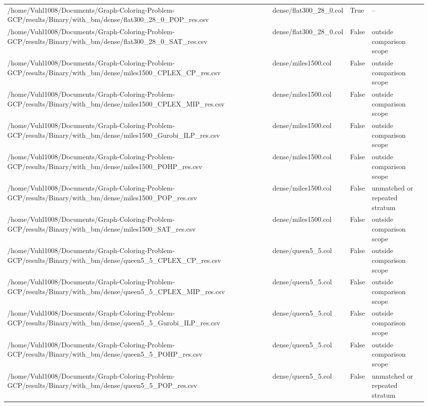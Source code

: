 \begin{table}[htbp]
\begin{tabular}{llll}
/home/Vuhl1008/Documents/Graph-Coloring-Problem-GCP/results/Binary/with\_bm/dense/flat300\_28\_0\_POP\_res.csv & dense/flat300\_28\_0.col & True & -- \\
/home/Vuhl1008/Documents/Graph-Coloring-Problem-GCP/results/Binary/with\_bm/dense/flat300\_28\_0\_SAT\_res.csv & dense/flat300\_28\_0.col & False & outside comparison scope \\
/home/Vuhl1008/Documents/Graph-Coloring-Problem-GCP/results/Binary/with\_bm/dense/miles1500\_CPLEX\_CP\_res.csv & dense/miles1500.col & False & outside comparison scope \\
/home/Vuhl1008/Documents/Graph-Coloring-Problem-GCP/results/Binary/with\_bm/dense/miles1500\_CPLEX\_MIP\_res.csv & dense/miles1500.col & False & outside comparison scope \\
/home/Vuhl1008/Documents/Graph-Coloring-Problem-GCP/results/Binary/with\_bm/dense/miles1500\_Gurobi\_ILP\_res.csv & dense/miles1500.col & False & outside comparison scope \\
/home/Vuhl1008/Documents/Graph-Coloring-Problem-GCP/results/Binary/with\_bm/dense/miles1500\_POHP\_res.csv & dense/miles1500.col & False & outside comparison scope \\
/home/Vuhl1008/Documents/Graph-Coloring-Problem-GCP/results/Binary/with\_bm/dense/miles1500\_POP\_res.csv & dense/miles1500.col & False & unmatched or repeated stratum \\
/home/Vuhl1008/Documents/Graph-Coloring-Problem-GCP/results/Binary/with\_bm/dense/miles1500\_SAT\_res.csv & dense/miles1500.col & False & outside comparison scope \\
/home/Vuhl1008/Documents/Graph-Coloring-Problem-GCP/results/Binary/with\_bm/dense/queen5\_5\_CPLEX\_CP\_res.csv & dense/queen5\_5.col & False & outside comparison scope \\
/home/Vuhl1008/Documents/Graph-Coloring-Problem-GCP/results/Binary/with\_bm/dense/queen5\_5\_CPLEX\_MIP\_res.csv & dense/queen5\_5.col & False & outside comparison scope \\
/home/Vuhl1008/Documents/Graph-Coloring-Problem-GCP/results/Binary/with\_bm/dense/queen5\_5\_Gurobi\_ILP\_res.csv & dense/queen5\_5.col & False & outside comparison scope \\
/home/Vuhl1008/Documents/Graph-Coloring-Problem-GCP/results/Binary/with\_bm/dense/queen5\_5\_POHP\_res.csv & dense/queen5\_5.col & False & outside comparison scope \\
/home/Vuhl1008/Documents/Graph-Coloring-Problem-GCP/results/Binary/with\_bm/dense/queen5\_5\_POP\_res.csv & dense/queen5\_5.col & False & unmatched or repeated stratum \\

\end{tabular}
\end{table}
